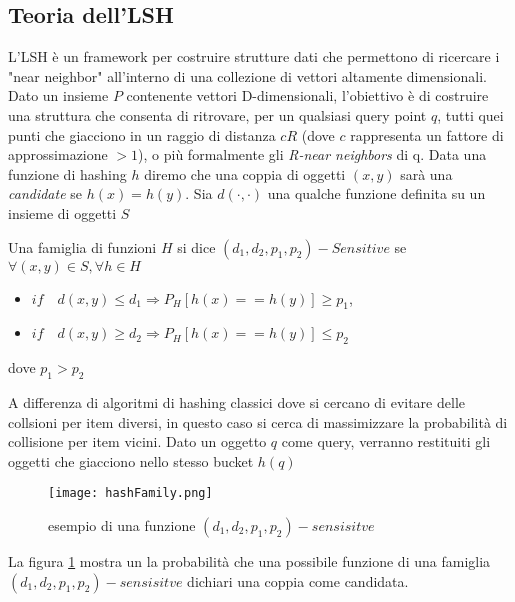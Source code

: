\subsection{Teoria dell'LSH}
 L'LSH è un framework per costruire strutture dati che permettono di ricercare i "near neighbor" all'interno di una collezione di vettori altamente dimensionali.  Dato un insieme $P$ contenente vettori D-dimensionali, l'obiettivo è di costruire una struttura che consenta di ritrovare, per un qualsiasi query point $q$, tutti quei punti che giacciono in un raggio di distanza $cR$ (dove $c$ rappresenta un fattore di approssimazione $>1$), o più formalmente gli \emph{R-near neighbors} di q.
 Data una funzione di hashing $h$ diremo che una coppia di oggetti $(x,y)$ sarà una \emph{candidate}   se $h(x)=h(y)$. Sia $d(\cdot,\cdot)$ una qualche funzione  definita su un insieme di oggetti $S$
\begin{definizione} 


Una famiglia di funzioni $H$ si dice $(d_1,d_2,p_1,p_2)-Sensitive$ se  $\forall (x,y) \in S ,\forall h \in H $ 
\begin{itemize}
\item $if \quad  d(x,y)\leq d_1 \Rightarrow P_H[h(x)==h(y)]\geq p_1  $,
\item $if \quad  d(x,y)\geq d_2 \Rightarrow P_H[h(x)==h(y)]\leq p_2  $
\end{itemize}
dove $p_1>p_2$
\end{definizione}
A differenza di algoritmi di hashing classici dove si cercano di evitare delle collsioni per item diversi, in questo caso si cerca di massimizzare la probabilità di collisione per item vicini.
Dato un oggetto $q$ come query, verranno restituiti gli oggetti che giacciono nello stesso bucket $h(q)$
 

\begin{figure}[h]
\centering
\texttt{[image: hashFamily.png]}
\caption{esempio di una funzione $(d_1,d_2,p_1,p_2)-sensisitve$}
\label{fig:lshfamily}
\end{figure} 
 
La figura \ref{fig:lshfamily} mostra un la probabilità che una possibile funzione di una famiglia  $(d_1,d_2,p_1,p_2)-sensisitve$ dichiari una coppia come candidata.

